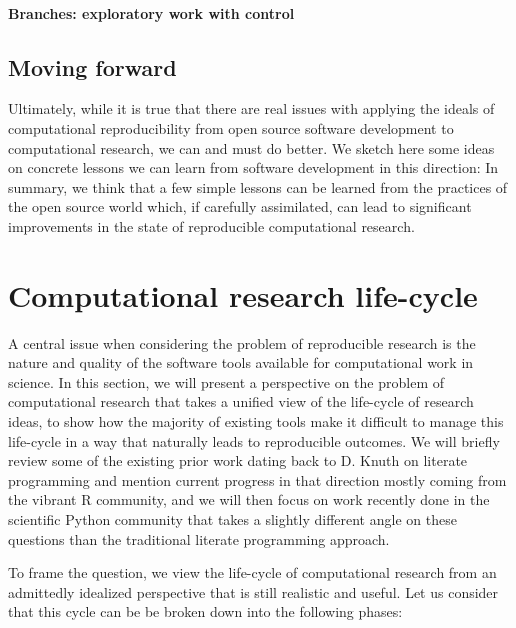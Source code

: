 \documentclass[ChapterTOCs,krantz2]{krantz} %
\begin{document}
\paragraph{ {\bf Branches: exploratory work with control}}


\subsection{Moving forward }

Ultimately, while it is true that there are real issues with applying
the ideals of computational reproducibility from open source software
development to computational research, we can and must do better.
We sketch here some ideas on concrete lessons we can learn from software
development in this direction:
In summary, we think that a few simple lessons can be learned from
the practices of the open source world which, if carefully assimilated,
can lead to significant improvements in the state of reproducible
computational research. 


\section{\label{sec:life-cycle}Computational research life-cycle}

A central issue when considering the problem of reproducible research is the
nature and quality of the software tools available for computational work in
science.  In this section, we will present a perspective on the problem of
computational research that takes a unified view of the life-cycle of research
ideas, to show how the majority of existing tools make it difficult to manage
this life-cycle in a way that naturally leads to reproducible outcomes.  We will
briefly review some of the existing prior work dating back to D. Knuth on
literate programming \cite{knuth_literate} and mention current progress in that direction mostly
coming from the vibrant R community, and we will then focus on work recently
done in the scientific Python community that takes a slightly different angle
on these questions than the traditional literate programming approach.

To frame the question, we view the life-cycle of computational research from an
admittedly idealized perspective that is still realistic and useful. Let us
consider that this cycle can be be broken down into the following phases:
\end{document}
